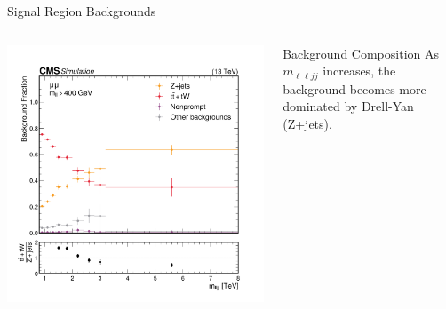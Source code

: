 \documentclass[aspectratio=169]{beamer}
\begin{document}
\begin{frame}{Signal Region Backgrounds}
  \begin{columns}
    \begin{column}{0.50\textwidth}
      \centering
      \includegraphics[width=\textwidth]{../figures/analysis/sr-bkg-frac-mumu.png}
    \end{column}
    \begin{column}{0.50\textwidth}
        \vspace*{-15mm}
        \centering
        \resizebox{\columnwidth}{!}{%
        }
      \vspace{1ex} 
      \begin{block}{Background Composition}
        As $m_{\ell\ell jj}$ increases, the background becomes more dominated by Drell-Yan (Z+jets).
      \end{block}
    \end{column}
  \end{columns}
\end{frame}
\end{document}
